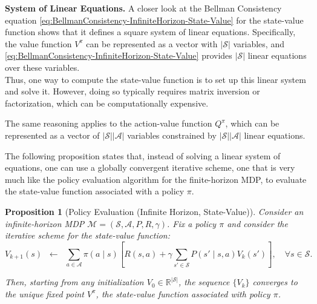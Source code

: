 \documentclass[
]{book}
\newtheorem{proposition}{Proposition}[chapter]
\theoremstyle{definition}
\theoremstyle{definition}
\theoremstyle{definition}
\theoremstyle{definition}
\theoremstyle{remark}
\begin{document}
\textbf{System of Linear Equations.} A closer look at the Bellman Consistency equation \eqref{eq:BellmanConsistency-InfiniteHorizon-State-Value} for the state-value function shows that it defines a square system of linear equations. Specifically, the value function \(V^{\pi}\) can be represented as a vector with \(|\mathcal{S}|\) variables, and \eqref{eq:BellmanConsistency-InfiniteHorizon-State-Value} provides \(|\mathcal{S}|\) linear equations over these variables.\\
Thus, one way to compute the state-value function is to set up this linear system and solve it. However, doing so typically requires matrix inversion or factorization, which can be computationally expensive.

The same reasoning applies to the action-value function \(Q^{\pi}\), which can be represented as a vector of \(|\mathcal{S}||\mathcal{A}|\) variables constrained by \(|\mathcal{S}||\mathcal{A}|\) linear equations.

The following proposition states that, instead of solving a linear system of equations, one can use a globally convergent iterative scheme, one that is very much like the policy evaluation algorithm for the finite-horizon MDP, to evaluate the state-value function associated with a policy \(\pi\).

\begin{proposition}[Policy Evaluation (Infinite Horizon, State-Value)]
\protect\hypertarget{prp:PolicyEvaluationInfiniteHorizonStateValue}{}\label{prp:PolicyEvaluationInfiniteHorizonStateValue}Consider an infinite-horizon MDP \(\mathcal{M}=(\mathcal{S},\mathcal{A},P,R,\gamma)\). Fix a policy \(\pi\) and consider the iterative scheme for the state-value function:
\begin{equation}
V_{k+1}(s) \;\; \gets \;\; \sum_{a \in \mathcal{A}} \pi(a \mid s) 
\left[ R(s,a) + \gamma \sum_{s' \in \mathcal{S}} P(s' \mid s,a) V_k(s') \right],
\quad \forall s \in \mathcal{S}.
\label{eq:PolicyEvaluationInfiniteHorizonStateValue}
\end{equation}

Then, starting from any initialization \(V_0 \in \mathbb{R}^{|\mathcal{S}|}\), the sequence \(\{V_k\}\) converges to the unique fixed point \(V^{\pi}\), the state-value function associated with policy \(\pi\).
\end{proposition}
\end{document}
